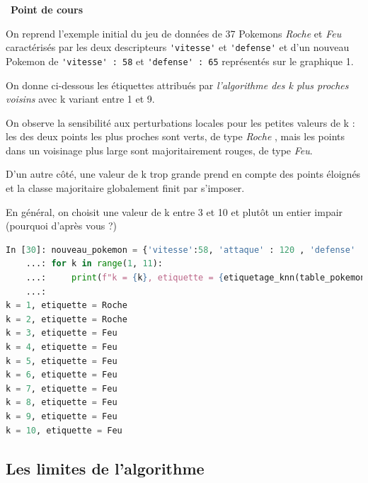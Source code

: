 \documentclass[
  11pt,
]{article}
\newcommand{\passthrough}[1]{#1}
\newcounter{thme}
\newcounter{def}
\newcounter{cours}
\newenvironment{cours}[1]
{\par \medskip   \addtocounter{cours}{1} \noindent  
\begin{bclogo}[arrondi =0.1,  ombre = true, barre=none, logo=\bcbook, marge=4]{~\textbf{Point de cours} \textbf{\thecours} {\itshape #1} }  \par}
{
\end{bclogo}
 \par \bigskip }
\newcounter{alg}
\begin{document}
\begin{cours}{}

On reprend l'exemple initial du jeu de données de 37 Pokemons
\emph{Roche} et \emph{Feu} caractérisés par les deux descripteurs
\passthrough{\lstinline!'vitesse'!} et
\passthrough{\lstinline!'defense'!} et d'un nouveau Pokemon de
\passthrough{\lstinline!'vitesse' : 58!} et
\passthrough{\lstinline!'defense' : 65!} représentés sur le graphique 1.

On donne ci-dessous les étiquettes attribués par \emph{l'algorithme des
k plus proches voisins} avec k variant entre 1 et 9.

On observe la sensibilité aux perturbations locales pour les petites
valeurs de k : les des deux points les plus proches sont verts, de type
\emph{Roche} , mais les points dans un voisinage plus large sont
majoritairement rouges, de type \emph{Feu}.

D'un autre côté, une valeur de k trop grande prend en compte des points
éloignés et la classe majoritaire globalement finit par s'imposer.

En général, on choisit une valeur de k entre 3 et 10 et plutôt un entier
impair (pourquoi d'après vous ?)

\begin{lstlisting}[language=Python]
In [30]: nouveau_pokemon = {'vitesse':58, 'attaque' : 120 , 'defense' : 65, 'vie' : 100 }
    ...: for k in range(1, 11):
    ...:     print(f"k = {k}, etiquette = {etiquetage_knn(table_pokemons_feu_roche, nouveau_pokemon, 'type', ['vitesse', 'defense'], k)}")
    ...:     
k = 1, etiquette = Roche
k = 2, etiquette = Roche
k = 3, etiquette = Feu
k = 4, etiquette = Feu
k = 5, etiquette = Feu
k = 6, etiquette = Feu
k = 7, etiquette = Feu
k = 8, etiquette = Feu
k = 9, etiquette = Feu
k = 10, etiquette = Feu
\end{lstlisting}

\end{cours}

\hypertarget{les-limites-de-lalgorithme}{%
\subsection{Les limites de
l'algorithme}\label{les-limites-de-lalgorithme}}
\end{document}
